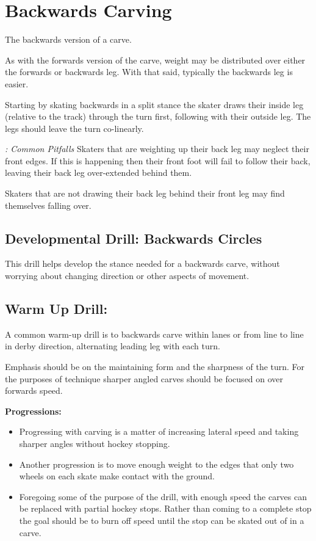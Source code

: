 
\section{Backwards Carving}

\label{sec:sticky/backwards_carves}

The backwards version of a carve.

As with the forwards version of the carve, weight may be distributed over either the forwards or backwards leg. With that said, typically the backwards leg is easier.  

Starting by skating backwards in a split stance the skater draws their inside leg (relative to the track) through the turn first, following with their outside leg.   
The legs should leave the turn co-linearly. 


{\it: Common Pitfalls}
Skaters that are weighting up their back leg may neglect their front edges. If this is happening then their front foot will fail to follow their back, leaving their back leg over-extended behind them.   


Skaters that are not drawing their back leg behind their front leg may find themselves falling over.  


\subsection*{Developmental Drill: Backwards Circles}

This drill helps develop the stance needed for a backwards carve, without worrying about changing direction or other aspects of movement.  


\subsection*{Warm Up Drill:}
A common warm-up drill is to backwards carve within lanes or from line to line in derby direction, alternating leading leg with each turn.    

Emphasis should be on the maintaining form and the sharpness of the turn. For the purposes of technique sharper angled carves should be focused on over forwards speed. 


{\bf Progressions:}

\begin{itemize}
    \item Progressing with carving is a matter of increasing lateral speed and taking sharper angles without hockey stopping. 
    \item  Another progression is to move enough weight to the edges that only two wheels on each skate make contact with the ground.
    \item Foregoing some of the purpose of the drill, with enough speed the carves can be replaced with partial hockey stops. Rather than coming to a complete stop the goal should be to burn off speed until the stop can be skated out of in a carve.    
\end{itemize}



